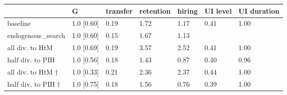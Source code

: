 \begin{tabular}{lllllll}
\toprule
 & \textbf{G} & \textbf{transfer} & \textbf{retention} & \textbf{hiring} & \textbf{UI level} & \textbf{UI duration} \\
\midrule
baseline & 1.0 [0.60] & 0.19 & 1.72 & 1.17 & 0.41 & 1.00 \\
endogenous_search & 1.0 [0.60] & 0.15 & 1.67 & 1.13 &  &  \\
all div. to HtM & 1.0 [0.69] & 0.19 & 3.57 & 2.52 & 0.41 & 1.00 \\
half div. to PIH & 1.0 [0.56] & 0.18 & 1.43 & 0.87 & 0.40 & 0.96 \\
all div. to HtM $\dagger$ & 1.0 [0.33] & 0.21 & 2.36 & 2.37 & 0.44 & 1.00 \\
half div. to PIH $\dagger$ & 1.0 [0.75] & 0.18 & 1.56 & 0.76 & 0.39 & 1.00 \\
\bottomrule
\end{tabular}
